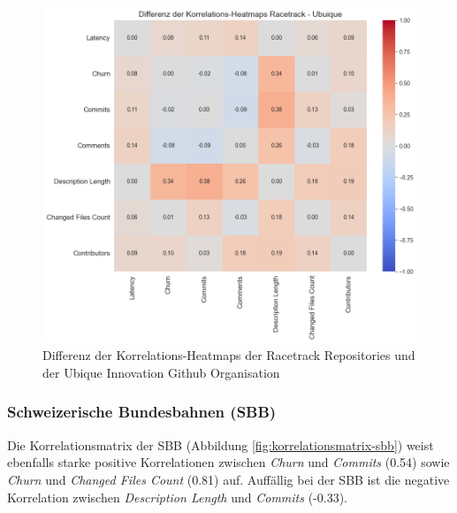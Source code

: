 \begin{figure}[htbp]
\includegraphics[width=\textwidth]{Figures/diff-korrelationsmatrix-racetrack-ubique.png}
\caption{Differenz der Korrelations-Heatmaps der Racetrack Repositories und der Ubique Innovation Github Organisation}
\label{fig:diff-korrelationsmatrix-racetrack-ubique}
\end{figure}

\newpage
\subsubsection{Schweizerische Bundesbahnen (SBB)}
Die Korrelationsmatrix der SBB (Abbildung \autoref{fig:korrelationsmatrix-sbb}) weist ebenfalls starke positive Korrelationen zwischen \textit{Churn} und \textit{Commits} (0.54) sowie \textit{Churn} und \textit{Changed Files Count} (0.81) auf. Auffällig bei der SBB ist die negative Korrelation zwischen \textit{Description Length} und \textit{Commits} (-0.33).

